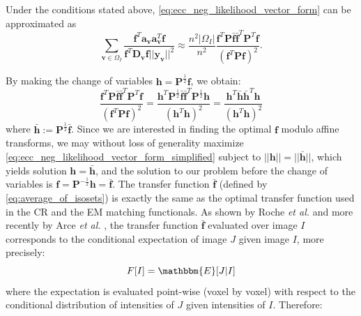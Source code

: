 Under the conditions stated above, \eqref{eq:ecc_neg_likelihood_vector_form} can be approximated as
\begin{equation}
    \sum_{\mathbf{v}\in\Omega_{I}}\frac{\mathbf{f}^{T}\mathbf{a}_{\mathbf{v}}\mathbf{a}_{\mathbf{v}}^{T}\mathbf{f}}
    {\mathbf{f}^{T} \mathbf{D}_{\mathbf{v}} \mathbf{f}||\mathbf{y}_{\mathbf{v}}||^{2}} \approx
    \frac{n^{2}|\Omega_{I}|}{n^{2}}
    \frac{\mathbf{f}^{T}\mathbf{P}\mathbf{\bar{f}}\mathbf{\bar{f}}^{T}\mathbf{P}^{T}\mathbf{f}}{\left(\mathbf{f}^{T} \mathbf{P} \mathbf{f}\right)^{2}}.
\end{equation}

By making the change of variables $\mathbf{h} = \mathbf{P}^{\frac{1}{2}}\mathbf{f}$, we obtain:
\begin{equation}\label{eq:ecc_neg_likelihood_vector_form_simplified}
    \frac{\mathbf{f}^{T}\mathbf{P}\mathbf{\bar{f}}\mathbf{\bar{f}}^{T}\mathbf{P}^{T}\mathbf{f}}{\left(\mathbf{f}^{T} \mathbf{P} \mathbf{f}\right)^{2}} =
    \frac{\mathbf{h}^{T}\mathbf{P}^{\frac{1}{2}}\mathbf{\bar{f}}\mathbf{\bar{f}}^{T}\mathbf{P}^{\frac{1}{2}}\mathbf{h}} {\left(\mathbf{h}^{T}\mathbf{h}\right)^{2}} =
    \frac{\mathbf{h}^{T}\mathbf{\bar{h}}\mathbf{\bar{h}}^{T}\mathbf{h}} {\left(\mathbf{h}^{T}\mathbf{h}\right)^{2}}
\end{equation}
where $\mathbf{\bar{h}} := \mathbf{P}^{\frac{1}{2}}\mathbf{\bar{f}}$. Since we are interested in finding the optimal $\mathbf{f}$ modulo affine transforms, we may without loss of generality maximize \eqref{eq:ecc_neg_likelihood_vector_form_simplified} subject to $||\mathbf{h}|| = ||\mathbf{\bar{h}}||$, which yields solution $\mathbf{h} = \mathbf{\bar{h}}$, and the solution to our problem before the change of variables is $\mathbf{f} = \mathbf{P}^{-\frac{1}{2}}\mathbf{h} = \mathbf{\bar{f}}$. The transfer function $\mathbf{\bar{f}}$ (defined by \eqref{eq:average_of_isosets}) is exactly the same as the optimal transfer function used in the CR and the EM matching functionals. As shown by Roche {\it et al.} \cite{Roche1998, Roche2000} and more recently by Arce {\it et al.} \cite{Arce-santana2014}, the transfer function $\mathbf{\bar{f}}$ evaluated over image $I$ corresponds to the conditional expectation of image $J$ given image $I$, more precisely:
\begin{equation*}
    F[I] = \mathbbm{E}[J | I]
\end{equation*}
where the expectation is evaluated point-wise (voxel by voxel) with respect to the conditional distribution of intensities of $J$ given intensities of $I$. Therefore:
